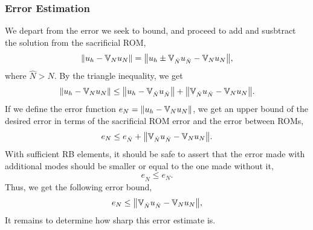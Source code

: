 \documentclass[../../thesis.tex]{subfiles}
\newcommand{\rbV}{\ensuremath{\mathbb{V}}}
\begin{document}
\subsubsection{Error Estimation}
We depart from the error we seek to bound,
and proceed to add and susbtract the solution from the sacrificial ROM,
\begin{equation}
    \norm{u_h - \rbV_{N} u_N} = \norm{u_h \pm \rbV_{\hat{N}} u_{\hat{N}} - \rbV_{N} u_{N}},
\end{equation}
where $\hat{N} > N$. 
By the triangle inequality, we get
\begin{equation}
    \norm{u_h - \rbV_{N} u_N} \leq \norm{u_h - \rbV_{\hat{N}} u_{\hat{N}}} + \norm{\rbV_{\hat{N}} u_{\hat{N}} - \rbV_{N} u_{N}}.
\end{equation}
If we define the error function $e_N = \norm{u_h - \rbV_{N} u_N}$, 
we get an upper bound of the desired error in terms of the sacrificial ROM error and the error between ROMs,
\begin{equation}
    e_N \leq e_{\hat{N}} + \norm{\rbV_{\hat{N}} u_{\hat{N}} - \rbV_{N} u_{N}}.
\end{equation}
With sufficient RB elements, it should be safe to assert that the error made 
with additional modes should be smaller or equal to the one made without it,
\begin{equation}
    e_{\hat{N}} \leq e_{N}.
\end{equation}
Thus, we get the following error bound,
\begin{equation}
    e_N \leq \norm{\rbV_{\hat{N}} u_{\hat{N}} - \rbV_{N} u_{N}},
\end{equation}
It remains to determine how sharp this error estimate is.
\end{document}
